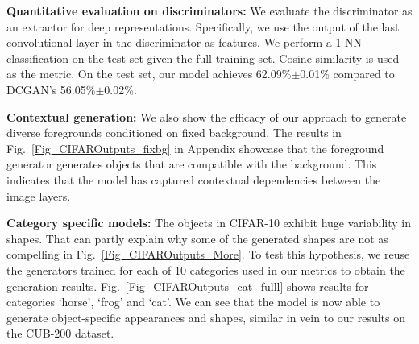 \documentclass{article} \usepackage{iclr2017_conference,times}
\begin{document}
{\bf Quantitative evaluation on discriminators:}  We evaluate the discriminator as an extractor for deep representations. Specifically, we use the output of the last convolutional layer in the discriminator as features. We perform a 1-NN classification on the test set given the full training set. Cosine similarity is used as the metric. On the test set, our model achieves 62.09\%$\pm$0.01\% compared to DCGAN's 56.05\%$\pm$0.02\%. 

{\bf Contextual generation:} We also show the efficacy of our approach to generate diverse foregrounds conditioned on fixed background. The results in Fig.~\ref{Fig_CIFAROutputs_fixbg} in Appendix showcase that the foreground generator generates objects that are compatible with the background. This indicates that the model has captured contextual dependencies between the image layers. 

{\bf Category specific models:} The objects in CIFAR-10 exhibit huge variability in shapes. That can partly explain why some of the generated shapes are not as compelling in Fig.~\ref{Fig_CIFAROutputs_More}. To test this hypothesis, we reuse the generators trained for each of 10 categories used in our metrics to obtain the generation results. Fig.~\ref{Fig_CIFAROutputs_cat_fulll} shows results for categories `horse', `frog' and `cat'. We can see that the model is now able to generate object-specific appearances and shapes, similar in vein to our results on the CUB-200 dataset.  

%
\end{document}

